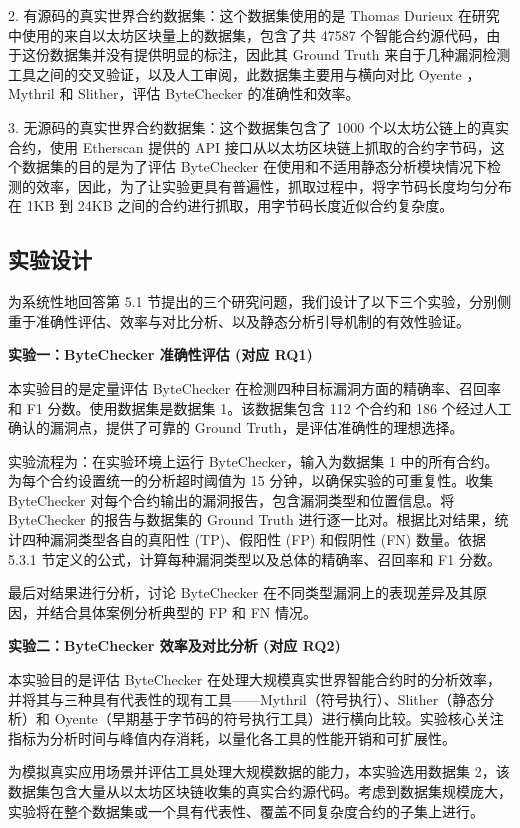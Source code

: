 \documentclass[print, master, vlined, timesmath]{DissertUESTC}
\begin{document}
2. 有源码的真实世界合约数据集：这个数据集使用的是 Thomas Durieux \cite{}在研究中使用的来自以太坊区块量上的数据集，包含了共 47587 个智能合约源代码，由于这份数据集并没有提供明显的标注，因此其 Ground Truth 来自于几种漏洞检测工具之间的交叉验证，以及人工审阅，此数据集主要用与横向对比 Oyente ， Mythril 和 Slither，评估 ByteChecker 的准确性和效率。

3. 无源码的真实世界合约数据集：这个数据集包含了 1000 个以太坊公链上的真实合约，使用 Etherscan \cite{}提供的 API 接口从以太坊区块链上抓取的合约字节码，这个数据集的目的是为了评估 ByteChecker 在使用和不适用静态分析模块情况下检测的效率，因此，为了让实验更具有普遍性，抓取过程中，将字节码长度均匀分布在 1KB 到 24KB 之间的合约进行抓取，用字节码长度近似合约复杂度。
\subsection{实验设计}

为系统性地回答第 5.1 节提出的三个研究问题，我们设计了以下三个实验，分别侧重于准确性评估、效率与对比分析、以及静态分析引导机制的有效性验证。

\textbf{实验一：ByteChecker 准确性评估 (对应 RQ1)}

本实验目的是定量评估 ByteChecker 在检测四种目标漏洞方面的精确率、召回率和 F1 分数。使用数据集是数据集 1。该数据集包含 112 个合约和 186 个经过人工确认的漏洞点，提供了可靠的 Ground Truth，是评估准确性的理想选择。

实验流程为：在实验环境上运行 ByteChecker，输入为数据集 1 中的所有合约。为每个合约设置统一的分析超时阈值为 15 分钟，以确保实验的可重复性。收集 ByteChecker 对每个合约输出的漏洞报告，包含漏洞类型和位置信息。将 ByteChecker 的报告与数据集的 Ground Truth 进行逐一比对。根据比对结果，统计四种漏洞类型各自的真阳性 (TP)、假阳性 (FP) 和假阴性 (FN) 数量。依据 5.3.1 节定义的公式，计算每种漏洞类型以及总体的精确率、召回率和 F1 分数。

最后对结果进行分析，讨论 ByteChecker 在不同类型漏洞上的表现差异及其原因，并结合具体案例分析典型的 FP 和 FN 情况。

\textbf{实验二：ByteChecker 效率及对比分析 (对应 RQ2)}

本实验目的是评估 ByteChecker 在处理大规模真实世界智能合约时的分析效率，并将其与三种具有代表性的现有工具——Mythril（符号执行）、Slither（静态分析）和 Oyente（早期基于字节码的符号执行工具）进行横向比较。实验核心关注指标为分析时间与峰值内存消耗，以量化各工具的性能开销和可扩展性。

为模拟真实应用场景并评估工具处理大规模数据的能力，本实验选用数据集 2，该数据集包含大量从以太坊区块链收集的真实合约源代码。考虑到数据集规模庞大，实验将在整个数据集或一个具有代表性、覆盖不同复杂度合约的子集上进行。
\end{document}
